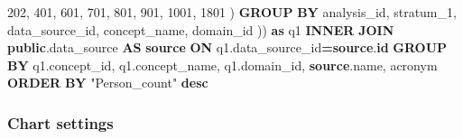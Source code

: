 \documentclass[
]{book}
\newenvironment{Shaded}{\begin{snugshade}}{\end{snugshade}}
\newcommand{\DecValTok}[1]{\textcolor[rgb]{0.00,0.00,0.81}{#1}}
\newcommand{\KeywordTok}[1]{\textcolor[rgb]{0.13,0.29,0.53}{\textbf{#1}}}
\newcommand{\NormalTok}[1]{#1}
\newcommand{\OperatorTok}[1]{\textcolor[rgb]{0.81,0.36,0.00}{\textbf{#1}}}
\newcommand{\OtherTok}[1]{\textcolor[rgb]{0.56,0.35,0.01}{#1}}
\begin{document}
\begin{Shaded}
\begin{Highlighting}[]
                \DecValTok{202}\NormalTok{, }\DecValTok{401}\NormalTok{, }\DecValTok{601}\NormalTok{, }\DecValTok{701}\NormalTok{, }\DecValTok{801}\NormalTok{, }\DecValTok{901}\NormalTok{, }\DecValTok{1001}\NormalTok{, }\DecValTok{1801}
\NormalTok{              )}
            \KeywordTok{GROUP} \KeywordTok{BY}
\NormalTok{              analysis\_id,}
\NormalTok{              stratum\_1,}
\NormalTok{              data\_source\_id,}
\NormalTok{              concept\_name,}
\NormalTok{              domain\_id}
\NormalTok{            )) }\KeywordTok{as}\NormalTok{ q1}
    \KeywordTok{INNER} \KeywordTok{JOIN} \KeywordTok{public}\NormalTok{.data\_source }\KeywordTok{AS} \KeywordTok{source}
      \KeywordTok{ON}\NormalTok{ q1.data\_source\_id}\OperatorTok{=}\KeywordTok{source}\NormalTok{.}\KeywordTok{id}
\KeywordTok{GROUP} \KeywordTok{BY}
\NormalTok{  q1.concept\_id,}
\NormalTok{  q1.concept\_name,}
\NormalTok{  q1.domain\_id,}
  \KeywordTok{source}\NormalTok{.name,}
\NormalTok{  acronym}
\KeywordTok{ORDER} \KeywordTok{BY} \OtherTok{"Person\_count"} \KeywordTok{desc}
\end{Highlighting}
\end{Shaded}

\hypertarget{chart-settings-24}{%
\subsubsection*{Chart settings}\label{chart-settings-24}}
\end{document}
